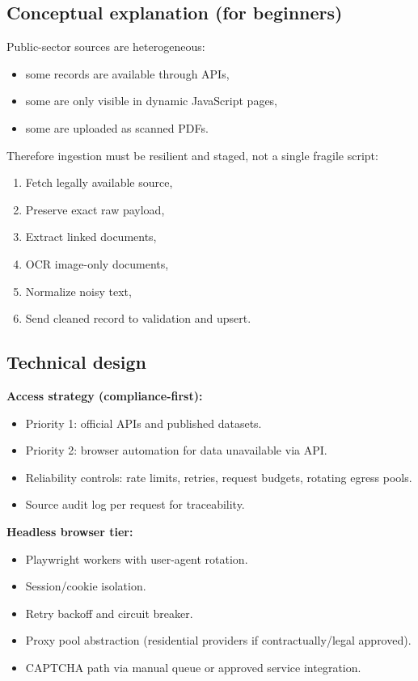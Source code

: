 \documentclass[11pt,a4paper]{article}
\begin{document}
\subsection{Conceptual explanation (for beginners)}
\begin{conceptbox}
Public-sector sources are heterogeneous:
\begin{itemize}[leftmargin=1.4em]
  \item some records are available through APIs,
  \item some are only visible in dynamic JavaScript pages,
  \item some are uploaded as scanned PDFs.
\end{itemize}

Therefore ingestion must be resilient and staged, not a single fragile script:
\begin{enumerate}[leftmargin=1.5em]
  \item Fetch legally available source,
  \item Preserve exact raw payload,
  \item Extract linked documents,
  \item OCR image-only documents,
  \item Normalize noisy text,
  \item Send cleaned record to validation and upsert.
\end{enumerate}
\end{conceptbox}

\subsection{Technical design}
\textbf{Access strategy (compliance-first):}
\begin{itemize}[leftmargin=1.4em]
  \item Priority 1: official APIs and published datasets.
  \item Priority 2: browser automation for data unavailable via API.
  \item Reliability controls: rate limits, retries, request budgets, rotating egress pools.
  \item Source audit log per request for traceability.
\end{itemize}

\textbf{Headless browser tier:}
\begin{itemize}[leftmargin=1.4em]
  \item Playwright workers with user-agent rotation.
  \item Session/cookie isolation.
  \item Retry backoff and circuit breaker.
  \item Proxy pool abstraction (residential providers if contractually/legal approved).
  \item CAPTCHA path via manual queue or approved service integration.
\end{itemize}
\end{document}
